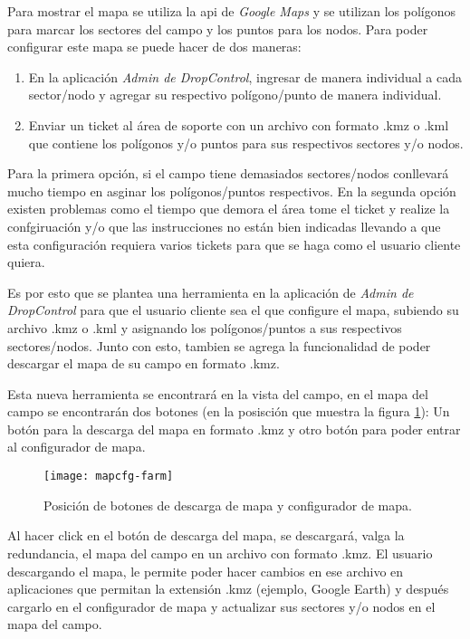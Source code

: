 Para mostrar el mapa se utiliza la api de \textit{Google Maps} y se utilizan los polígonos para marcar los sectores del campo y los puntos para los nodos.
Para poder configurar este mapa se puede hacer de dos maneras:
\begin{enumerate}
    \item En la aplicación \textit{Admin de DropControl}, ingresar de manera individual a cada sector/nodo y agregar su respectivo polígono/punto de manera individual.
    \item Enviar un ticket al área de soporte con un archivo con formato .kmz o .kml que contiene los polígonos y/o puntos para sus respectivos sectores y/o nodos.
\end{enumerate}
Para la primera opción, si el campo tiene demasiados sectores/nodos conllevará mucho tiempo en asginar los polígonos/puntos respectivos.
En la segunda opción existen problemas como el tiempo que demora el área tome el ticket y realize la confgiruación y/o
que las instrucciones no están bien indicadas llevando a que esta configuración requiera varios tickets para que se haga como el usuario cliente quiera.

Es por esto que se plantea una herramienta en la aplicación de \textit{Admin de DropControl} para que el usuario cliente sea el que
configure el mapa, subiendo su archivo .kmz o .kml y asignando los polígonos/puntos a sus respectivos sectores/nodos.
Junto con esto, tambien se agrega la funcionalidad de poder descargar el mapa de su campo en formato .kmz.

Esta nueva herramienta se encontrará en la vista del campo, en el mapa del campo se encontrarán dos botones (en la posisción que muestra la figura \ref{fig:mapcfg-farm}): Un botón para la descarga del mapa en formato .kmz y otro botón para poder entrar al configurador de mapa.

\begin{figure}[H]
	\centering
	\texttt{[image: mapcfg-farm]}
	\caption{\label{fig:mapcfg-farm} Posición de botones de descarga de mapa y configurador de mapa.}
\end{figure}

Al hacer click en el botón de descarga del mapa, se descargará, valga la redundancia, el mapa del campo en un archivo con formato .kmz. El usuario descargando el mapa, le permite poder hacer cambios en ese archivo en aplicaciones que permitan la extensión .kmz (ejemplo, Google Earth) y después cargarlo en el configurador de mapa y actualizar sus sectores y/o nodos en el mapa del campo.

